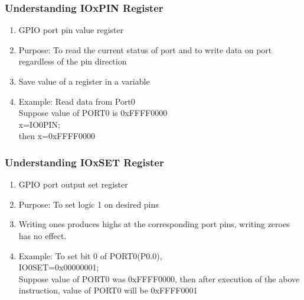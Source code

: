 \documentclass[10pt,red]{beamer}
\begin{document}
\begin{frame}
	\frametitle{Understanding IOxPIN Register} \pause
	\begin{enumerate}
		\item<+-|alert@+> GPIO port pin value register   \\[10pt]
		\item<+-|alert@+> Purpose: To read the current status of port and to write data on port regardless of the pin direction  \\[10pt]
		\item<+-|alert@+> Save value of a register in a variable  \\[10pt]			
		\item<+-|alert@+> \color{red}Example: Read data from Port0  \\[10pt]
		\pause	\color{black}
		Suppose value of PORT0 is 0xFFFF0000 \\ \pause
		x=IO0PIN; \\ \pause
		then x=0xFFFF0000 \pause
	\end{enumerate}
\end{frame}

\begin{frame}
	\frametitle{Understanding IOxSET Register} \pause
		\begin{enumerate}
			\item<+-|alert@+> GPIO port output set register\\[10pt]
			\item<+-|alert@+> Purpose: To set logic 1 on desired pins   \\[10pt]
			\item<+-|alert@+> Writing ones produces highs at the corresponding port pins, writing zeroes has no effect.\\[10pt]
			\item<+-|alert@+> \color{red}Example: To set bit 0 of PORT0(P0.0),  \\[10pt] \pause
			\color{black} 
			IO0SET=0x00000001; \\[10pt] \pause
			Suppose value of PORT0 was 0xFFFF0000, then after execution of the above instruction, value of PORT0 will be 0xFFFF0001 \pause
		\end{enumerate}
\end{frame}
\end{document}
